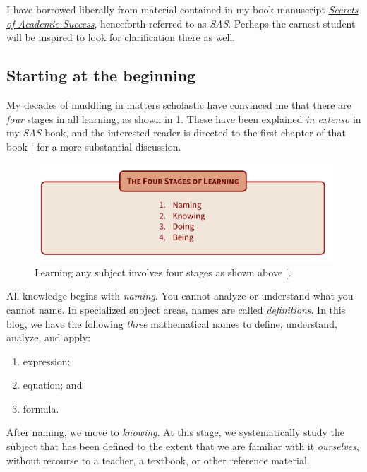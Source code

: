 \documentclass[
  a4paper,
]{article}
\providecommand{\tightlist}{%
  \setlength{\itemsep}{0pt}\setlength{\parskip}{0pt}}
\begin{document}
I have borrowed liberally from material contained in my book-manuscript
\href{https://swanlotus.netlify.app/sas-manuscript/SAS-partial.pdf}{\emph{Secrets
of Academic Success}}, henceforth referred to as \emph{SAS}. Perhaps the
earnest student will be inspired to look for clarification there as
well.  \normalfont

\subsection{Starting at the beginning}\label{starting-at-the-beginning}

My decades of muddling in matters scholastic have convinced me that
there are \emph{four} stages in all learning, as shown in
\cref{fig:four-stages}. These have been explained \emph{in extenso} in
my \emph{SAS} book, and the interested reader is directed to the first
chapter of that book {[}\citeproc{ref-sas}{1}{]} for a more substantial
discussion.

\begin{figure}
\centering
\includegraphics[width=0.9\linewidth,height=\textheight,keepaspectratio]{images/four-stages-of-learning.png}
\caption{Learning any subject involves four stages as shown above
{[}\citeproc{ref-sas}{1}{]}.}\label{fig:four-stages}
\end{figure}

All knowledge begins with \emph{naming}. You cannot analyze or
understand what you cannot name. In specialized subject areas, names are
called \emph{definitions}. In this blog, we have the following
\emph{three} mathematical names to define, understand, analyze, and
apply:

\begin{enumerate}
\tightlist
\item
  expression;
\item
  equation; and
\item
  formula.
\end{enumerate}

After naming, we move to \emph{knowing}. At this stage, we
systematically study the subject that has been defined to the extent
that we are familiar with it \emph{ourselves}, without recourse to a
teacher, a textbook, or other reference material.
\end{document}
